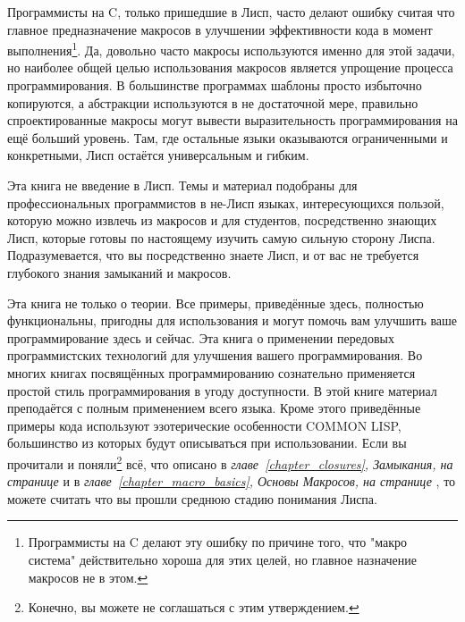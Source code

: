 Программисты на C, только пришедшие в Лисп, часто делают ошибку считая что главное предназначение макросов в улучшении эффек\-тив\-ности кода в момент выполнения\footnote{Программисты на C делают эту ошибку по причине того, что "макро система" действительно хороша для этих целей, но главное назначение макросов не в этом.}. Да, довольно часто макросы ис\-поль\-зуются именно для этой задачи, но наиболее общей целью использования макросов является упрощение процесса программирования. В боль\-шинс\-тве программах шаблоны просто избыточно копируются, а абстракции используются в не достаточной мере, правильно спроектированные мак\-ро\-сы могут вывести выразительность программирования на ещё боль\-ший уровень. Там, где остальные языки оказываются ограниченными и конкретными, Лисп остаётся универсальным и гибким.

Эта книга не введение в Лисп. Темы и материал подобраны для профессиональных программистов в не-Лисп языках, интересующихся пользой, которую можно извлечь из макросов и для студентов, пос\-редс\-твен\-но знающих Лисп, которые готовы по настоящему изучить самую сильную сторону Лиспа. Подразумевается, что вы посредственно знаете Лисп, и от вас не требуется глубокого знания замыканий и макросов.

Эта книга не только о теории. Все примеры, приведённые здесь, полностью функциональны, пригодны для использования и могут по\-мочь вам улучшить ваше программирование здесь и сейчас. Эта книга о применении передовых программистских технологий для улучшения вашего программирования. Во многих книгах посвящённых прог\-рам\-ми\-ро\-ва\-нию сознательно применяется простой стиль программирования в угоду доступности. В этой книге материал преподаётся с полным применением всего языка. Кроме этого приведённые примеры кода ис\-поль\-зуют эзотерические особенности COMMON LISP, большинство из которых будут описываться при использовании. Если вы прочитали и поняли\footnote{Конечно, вы можете не соглашаться с этим утверждением.} всё, что описано в \emph{главе~\ref{chapter_closures}, Замыкания, на странице \pageref{chapter_closures}} и в \emph{главе~\ref{chapter_macro_basics}, Основы Макросов, на странице \pageref{chapter_macro_basics}}, то можете считать что вы прошли среднюю стадию понимания Лиспа.

